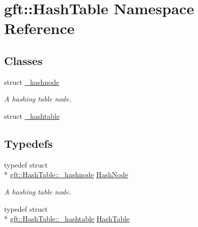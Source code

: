 \hypertarget{namespacegft_1_1HashTable}{\section{gft\-:\-:Hash\-Table Namespace Reference}
\label{namespacegft_1_1HashTable}
}
\subsection*{Classes}
\begin{DoxyCompactItemize}
\item 
struct \hyperlink{structgft_1_1HashTable_1_1__hashnode}{\-\_\-hashnode}
\begin{DoxyCompactList}\small\item\em A hashing table node. \end{DoxyCompactList}\item 
struct \hyperlink{structgft_1_1HashTable_1_1__hashtable}{\-\_\-hashtable}
\end{DoxyCompactItemize}
\subsection*{Typedefs}
\begin{DoxyCompactItemize}
\item 
typedef struct \\*
\hyperlink{structgft_1_1HashTable_1_1__hashnode}{gft\-::\-Hash\-Table\-::\-\_\-hashnode} \hyperlink{namespacegft_1_1HashTable_a4eada131a57cbf3ab87cfb50823b3613}{Hash\-Node}
\begin{DoxyCompactList}\small\item\em A hashing table node. \end{DoxyCompactList}\item 
typedef struct \\*
\hyperlink{structgft_1_1HashTable_1_1__hashtable}{gft\-::\-Hash\-Table\-::\-\_\-hashtable} \hyperlink{namespacegft_1_1HashTable_a02013deb74406aa4895230360fc84a94}{Hash\-Table}
\end{DoxyCompactItemize}
